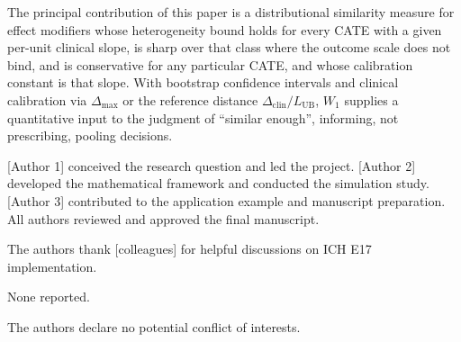 \documentclass[AMA,Times1COL]{WileyNJDv5}
\begin{document}
The principal contribution of this paper is a distributional similarity measure for effect modifiers whose heterogeneity bound holds for every CATE with a given per-unit clinical slope, is sharp over that class where the outcome scale does not bind, and is conservative for any particular CATE, and whose calibration constant is that slope. With bootstrap confidence intervals and clinical calibration via $\Delta_{\max}$ or the reference distance $\Delta_{\text{clin}} / L_{\text{UB}}$, $W_1$ supplies a quantitative input to the judgment of ``similar enough'', informing, not prescribing, pooling decisions.



[Author 1] conceived the research question and led the project. [Author 2] developed the mathematical framework and conducted the simulation study. [Author 3] contributed to the application example and manuscript preparation. All authors reviewed and approved the final manuscript.


The authors thank [colleagues] for helpful discussions on ICH E17 implementation.


None reported.


The authors declare no potential conflict of interests.

\end{document}
